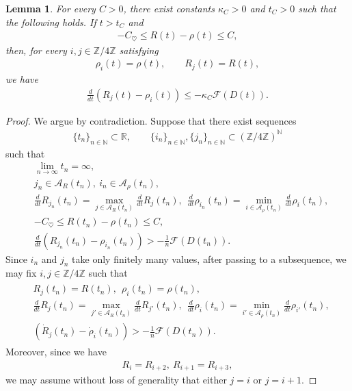 \documentclass[reqno]{amsart}
\theoremstyle{plain}
\newtheorem{lemma}[theorem]{Lemma}
\theoremstyle{definition}
\numberwithin{equation}{section}
\begin{document}
\begin{lemma}\label{|R|-rholem}
For every $C>0$, there exist constants $\kappa_C>0$ and $t_C>0$ such that the following holds. If $t>t_C$ and
\begin{align}\label{sameesass}
-C_{\heartsuit}
\leq R(t)-\rho(t)
\leq C,
\end{align}
then, for every $i,j\in\mathbb{Z}/4\mathbb{Z}$ satisfying
\begin{align*}
\rho_i(t)=\rho(t),
\qquad
R_j(t)=R(t),
\end{align*}
we have
\begin{align*}
\frac{d}{dt}\left(R_j(t)-\rho_i(t)\right)
\leq
-\kappa_C\mathcal{F}(D(t)).
\end{align*}
\end{lemma}
\begin{proof}
We argue by contradiction. Suppose that there exist sequences
\begin{align*}
\{t_n\}_{n\in\mathbb{N}}\subset\mathbb{R},
\qquad
\{i_n\}_{n\in\mathbb{N}},
\{j_n\}_{n\in\mathbb{N}}
\subset
\left(\mathbb{Z}/4\mathbb{Z}\right)^{\mathbb{N}}
\end{align*}
such that
\begin{align*}
&\lim_{n\to\infty}t_n=\infty,
\\
&j_n\in\mathcal{A}_R(t_n),\ i_n\in\mathcal{A}_{\rho}(t_n),
\\
&\frac{d}{dt}R_{j_n}(t_n)
=
\max_{j\in\mathcal{A}_R(t_n)}
\frac{d}{dt}R_j(t_n),\ \ \frac{d}{dt}\rho_{i_n}(t_n)
=
\min_{i\in\mathcal{A}_{\rho}(t_n)}
\frac{d}{dt}\rho_i(t_n),
\\
&-C_{\heartsuit}
\leq
R(t_n)-\rho(t_n)
\leq C,
\\
&\frac{d}{dt}
\left(R_{j_n}(t_n)-\rho_{i_n}(t_n)\right)
>
-\frac{1}{n}\mathcal{F}(D(t_n)).
\end{align*}
Since $i_n$ and $j_n$ take only finitely many values, after passing to a subsequence, we may fix $i,j\in\mathbb{Z}/4\mathbb{Z}$ such that
\begin{align}\label{rhoRlemsaishonokatei}
\begin{aligned}
&R_j(t_n)=R(t_n),\ \ \rho_i(t_n)=\rho(t_n),
\\
&\frac{d}{dt}R_j(t_n)
=
\max_{j'\in\mathcal{A}_R(t_n)}
\frac{d}{dt}R_{j'}(t_n),\ \ \frac{d}{dt}\rho_i(t_n)
=
\min_{i'\in\mathcal{A}_{\rho}(t_n)}
\frac{d}{dt}\rho_{i'}(t_n),
\\
&\left(\dot{R}_j(t_n)-\dot{\rho}_i(t_n)\right)
>
-\frac{1}{n}\mathcal{F}(D(t_n)).
\end{aligned}
\end{align}
Moreover, since we have
\begin{align*}
R_i=R_{i+2},\ R_{i+1}=R_{i+3},
\end{align*}
we may assume without loss of generality that either $j=i$ or $j=i+1$.


\end{proof}
\end{document}
